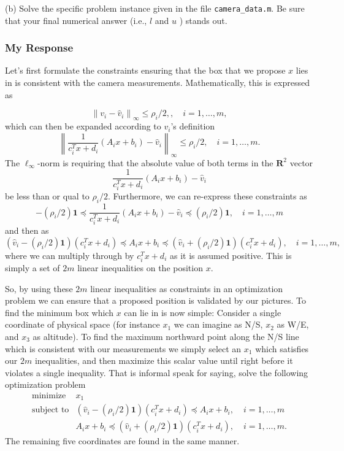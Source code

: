 \documentclass[12pt,reqno]{article}
\theoremstyle{definition}
\numberwithin{equation}{section}
\begin{document}
\vspace{0.1cm}
\noindent (b) Solve the specific problem instance given in the file \lstinline|camera_data.m|. Be sure that your final numerical answer (i.e., $l$ and $u$ ) stands out.

\subsubsection*{My Response}

Let's first formulate the constraints ensuring that the box that we propose $x$ lies in is consistent with the camera measurements.
Mathematically, this is expressed as

\[\left\lVert v_i - \hat{v}_i \right\rVert_{\infty} \le \rho_i / 2, , \quad i = 1, \ldots, m,\]
which can then be expanded according to $v_i$'s definition
\[\left\lVert \frac{1}{c_i^T x+d_i}\left(A_i x+b_i\right) - \hat{v}_i \right\rVert_{\infty} \le \rho_i/2, \quad i = 1, \ldots, m.\]
The $\ell_{\infty}$-norm is requiring that the absolute value of both terms in the $\mathbf{R}^2$ vector
\[\frac{1}{c_i^T x+d_i}\left(A_i x+b_i\right) - \hat{v}_i\]
be less than or qual to $\rho_i/2$. Furthermore, we can re-express these constraints as
\[-(\rho_i/2) \bm{1} \preceq \frac{1}{c_i^T x+d_i}\left(A_i x+b_i\right) - \hat{v}_i \preceq (\rho_i/2) \bm{1}, \quad i = 1, \ldots, m\]
and then as
\[(\hat{v}_i - (\rho_i/2) \bm{1})(c_i^T x + d_i) \preceq A_i x + b_i \preceq (\hat{v}_i + (\rho_i/2)\bm{1})(c_i^Tx + d_i), \quad i = 1, \ldots, m,\]
where we can multiply through by $c_i^Tx + d_i$ as it is assumed positive.
This is simply a set of $2m$ linear inequalities on the position $x$. 

\noindent So, by using these $2m$ linear inequalities as constraints in an optimization problem we can ensure
that a proposed position is validated by our pictures. To find the minimum box which $x$ can lie in is now simple:
Consider a single coordinate of physical space (for instance $x_1$ we can imagine as N/S, $x_2$ as W/E,
and $x_3$ as altitude). To find the maximum northward point along the N/S line which is consistent with our measurements we simply select
an $x_1$ which satisfies our $2m$ inequalities, and then maximize this scalar value until right before it violates a single inequality.
That is informal speak for saying, solve the following optimization problem
\[\begin{array}{lll}
\text{minimize} \; & x_1 & \\
\text{subject to} & (\hat{v}_i - (\rho_i/2) \bm{1})(c_i^T x + d_i) \preceq A_i x + b_i, \; & i = 1, \ldots, m \\
& A_i x + b_i \preceq (\hat{v}_i + (\rho_i/2)\bm{1})(c_i^Tx + d_i), \; & i = 1, \ldots, m.
\end{array}\]
The remaining five coordinates are found in the same manner.
\end{document}
